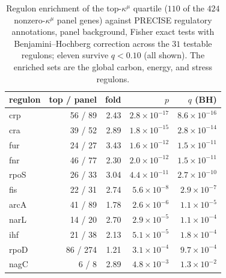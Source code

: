 \documentclass[11pt,a4paper]{article}
\theoremstyle{plain}
\theoremstyle{definition}
\theoremstyle{remark}
\newcommand{\kmu}{\kappa^{\mu}}
\begin{document}
\begin{table}[t]
\centering
\caption{Regulon enrichment of the top-$\kmu$ quartile ($110$ of
the $424$ nonzero-$\kmu$ panel genes) against PRECISE regulatory
annotations, panel background, Fisher exact tests with
Benjamini--Hochberg correction across the $31$ testable regulons;
eleven survive $q < 0.10$ (all shown). The enriched sets are the
global carbon, energy, and stress regulons.}
\label{tab:regulons}
\small
\begin{tabular}{lrrrr}
\toprule
regulon & top / panel & fold & $p$ & $q$ (BH) \\
\midrule
crp & 56 / 89 & 2.43 & $2.8 \times 10^{-17}$ & $8.6 \times 10^{-16}$ \\
cra & 39 / 52 & 2.89 & $1.8 \times 10^{-15}$ & $2.8 \times 10^{-14}$ \\
fur & 24 / 27 & 3.43 & $1.6 \times 10^{-12}$ & $1.5 \times 10^{-11}$ \\
fnr & 46 / 77 & 2.30 & $2.0 \times 10^{-12}$ & $1.5 \times 10^{-11}$ \\
rpoS & 26 / 33 & 3.04 & $4.4 \times 10^{-11}$ & $2.7 \times 10^{-10}$ \\
fis & 22 / 31 & 2.74 & $5.6 \times 10^{-8}$ & $2.9 \times 10^{-7}$ \\
arcA & 41 / 89 & 1.78 & $2.6 \times 10^{-6}$ & $1.1 \times 10^{-5}$ \\
narL & 14 / 20 & 2.70 & $2.9 \times 10^{-5}$ & $1.1 \times 10^{-4}$ \\
ihf & 21 / 38 & 2.13 & $5.1 \times 10^{-5}$ & $1.8 \times 10^{-4}$ \\
rpoD & 86 / 274 & 1.21 & $3.1 \times 10^{-4}$ & $9.7 \times 10^{-4}$ \\
nagC & 6 / 8 & 2.89 & $4.8 \times 10^{-3}$ & $1.3 \times 10^{-2}$ \\
\bottomrule
\end{tabular}
\end{table}
\end{document}
